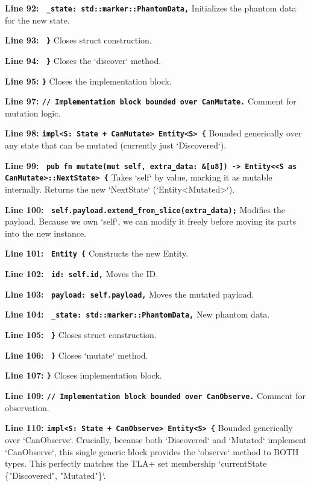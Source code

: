 \textbf{Line 92: \texttt{            \_state: std::marker::PhantomData,}}
Initializes the phantom data for the new state.

\textbf{Line 93: \texttt{        \}}}
Closes struct construction.

\textbf{Line 94: \texttt{    \}}}
Closes the `discover` method.

\textbf{Line 95: \texttt{\}}}
Closes the implementation block.

\textbf{Line 97: \texttt{// Implementation block bounded over CanMutate.}}
Comment for mutation logic.

\textbf{Line 98: \texttt{impl<S: State + CanMutate> Entity<S> \{}}
Bounded generically over any state that can be mutated (currently just `Discovered`).

\textbf{Line 99: \texttt{    pub fn mutate(mut self, extra\_data: \&[u8]) -> Entity<<S as CanMutate>::NextState> \{}}
Takes `self` by value, marking it as mutable internally. Returns the new `NextState` (`Entity<Mutated>`).

\textbf{Line 100: \texttt{        self.payload.extend\_from\_slice(extra\_data);}}
Modifies the payload. Because we own `self`, we can modify it freely before moving its parts into the new instance.

\textbf{Line 101: \texttt{        Entity \{}}
Constructs the new Entity.

\textbf{Line 102: \texttt{            id: self.id,}}
Moves the ID.

\textbf{Line 103: \texttt{            payload: self.payload,}}
Moves the mutated payload.

\textbf{Line 104: \texttt{            \_state: std::marker::PhantomData,}}
New phantom data.

\textbf{Line 105: \texttt{        \}}}
Closes struct construction.

\textbf{Line 106: \texttt{    \}}}
Closes `mutate` method.

\textbf{Line 107: \texttt{\}}}
Closes implementation block.

\textbf{Line 109: \texttt{// Implementation block bounded over CanObserve.}}
Comment for observation.

\textbf{Line 110: \texttt{impl<S: State + CanObserve> Entity<S> \{}}
Bounded generically over `CanObserve`. Crucially, because both `Discovered` and `Mutated` implement `CanObserve`, this single generic block provides the `observe` method to BOTH types. This perfectly matches the TLA+ set membership `currentState \in \{"Discovered", "Mutated"\}`.

